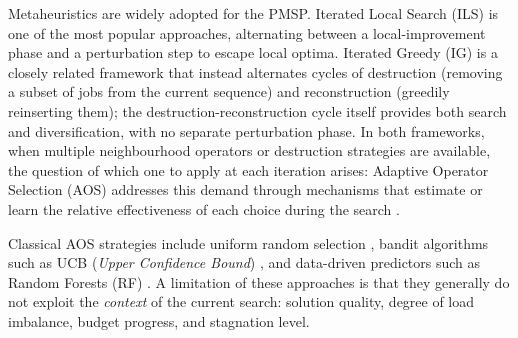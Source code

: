 \documentclass[final,3p,times,11pt,authoryear]{elsarticle}
\begin{document}
Metaheuristics are widely adopted for the PMSP.
Iterated Local Search (ILS) \citep{LourencaoEtal2019} is one of the
most popular approaches, alternating between a local-improvement phase
and a perturbation step to escape local optima.
Iterated Greedy (IG) \citep{RuizStutzle2007} is a closely related
framework that instead alternates cycles of destruction (removing a
subset of jobs from the current sequence) and reconstruction (greedily
reinserting them); the destruction-reconstruction cycle itself provides
both search and diversification, with no separate perturbation phase.
In both frameworks, when multiple neighbourhood operators or
destruction strategies are available, the question of which one to
apply at each iteration arises: Adaptive Operator Selection (AOS)
addresses this demand through mechanisms that estimate or learn the
relative effectiveness of each choice during the search
\citep{FialhoEtal2010,KarimiMamaghanEtal2022}.

Classical AOS strategies include uniform random selection
\citep{PisingerRopke2007}, bandit algorithms such as UCB (\textit{Upper
Confidence Bound}) \citep{AuerEtal2002}, and data-driven predictors
such as Random Forests (RF) \citep{MaturanaSaubion2008}.
A limitation of these approaches is that they generally do not exploit
the \emph{context} of the current search: solution quality, degree of
load imbalance, budget progress, and stagnation level.
\end{document}
